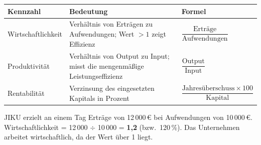 \documentclass[11pt, a4paper]{article}
\begin{document}
\begin{center}
\begin{tabular}{p{3.5cm} p{6cm} p{4cm}}
\toprule
\textbf{Kennzahl} & \textbf{Bedeutung} & \textbf{Formel}\\
\midrule
Wirtschaftlichkeit & Verhältnis von Erträgen zu Aufwendungen; Wert $>1$ zeigt Effizienz &
$\dfrac{\text{Erträge}}{\text{Aufwendungen}}$\\[1.2em]
Produktivität & Verhältnis von Output zu Input; misst die mengenmäßige Leistungseffizienz &
$\dfrac{\text{Output}}{\text{Input}}$\\[1.2em]
Rentabilität & Verzinsung des eingesetzten Kapitals in Prozent &
$\dfrac{\text{Jahresüberschuss} \times 100}{\text{Kapital}}$\\[0.6em]
\bottomrule
\end{tabular}
\end{center}

\begin{merksatz}[title={\bfseries Rechenbeispiel Wirtschaftlichkeit}]
JIKU erzielt an einem Tag Erträge von 12\,000\,€ bei Aufwendungen von 10\,000\,€.
Wirtschaftlichkeit = 12\,000 $\div$ 10\,000 = \textbf{1{,}2} (bzw.\ 120\,\%).
Das Unternehmen arbeitet wirtschaftlich, da der Wert über 1 liegt.
\end{merksatz}
\end{document}
